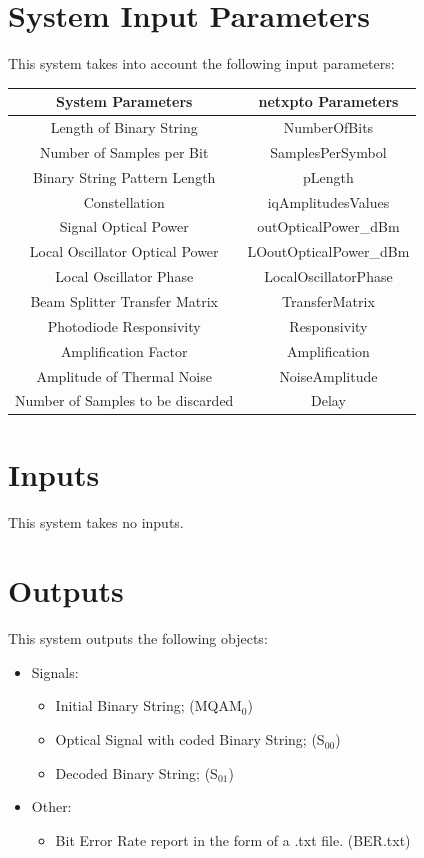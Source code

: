 \documentclass[a4paper]{article}
\begin{document}
\section{System Input Parameters}

This system takes into account the following input parameters:

\begin{table}[H]
\centering
\begin{tabular}{c|c}
System Parameters    			 & netxpto Parameters     \\ \hline
Length of Binary String 			 & NumberOfBits           \\
Number of Samples per Bit 		 & SamplesPerSymbol       \\
Binary String Pattern Length 	 & pLength                \\
Constellation 					 & iqAmplitudesValues     \\
Signal Optical Power 			 & outOpticalPower\_dBm   \\
Local Oscillator Optical Power	 & LOoutOpticalPower\_dBm \\
Local Oscillator Phase 			 & LocalOscillatorPhase   \\
Beam Splitter Transfer Matrix 	 & TransferMatrix         \\
Photodiode Responsivity 			 & Responsivity           \\
Amplification Factor 			 & Amplification          \\
Amplitude of Thermal Noise        & NoiseAmplitude         \\
Number of Samples to be discarded & Delay                  
\end{tabular}
\end{table}

\section{Inputs}

This system takes no inputs.

\section{Outputs}

This system outputs the following objects:
\begin{itemize}
\item Signals:
\begin{itemize}
\item Initial Binary String; (MQAM$_0$)
\item Optical Signal with coded Binary String; (S$_{00}$)
\item Decoded Binary String; (S$_{01}$)
\end{itemize}
\item Other:
\begin{itemize}
\item Bit Error Rate report in the form of a .txt file. (BER.txt)
\end{itemize}
\end{itemize}
\end{document}
